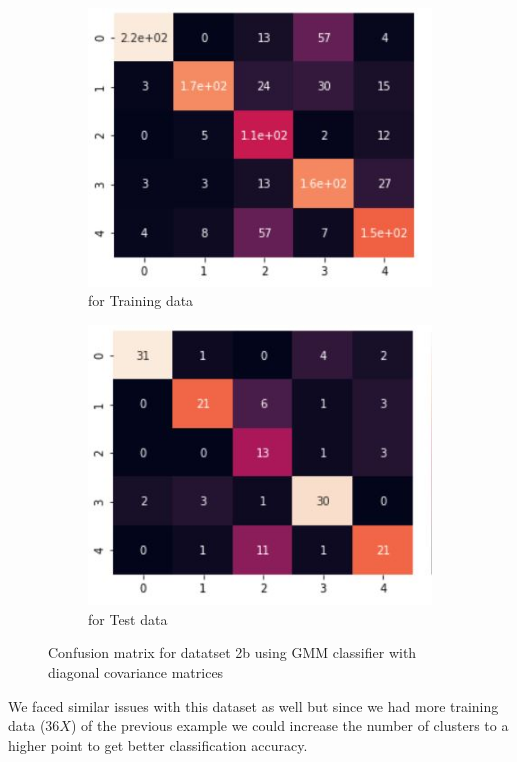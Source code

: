 \documentclass[11pt]{article}
\begin{document}
\begin{figure}[h]
\centering
	\begin{subfigure}[b]{0.45\textwidth}
	\centering
	\includegraphics[scale=0.6]{dataset2b_gmm_diagonal_hm_train.jpg}
	\caption{for Training data}
	\label{fig:fig2.2.3.1}
	\end{subfigure}
	\hfill
	\begin{subfigure}[b]{0.45\textwidth}
	\centering
	\includegraphics[scale=0.6]{dataset2b_gmm_diagonal_hm_test.jpg}
	\caption{for Test data}
	\label{fig:fig2.2.3.2}
	\end{subfigure}
\caption{Confusion matrix for datatset 2b using GMM classifier with diagonal covariance matrices}
\label{fig:fig1.2.1}
\end{figure}

We faced similar issues with this dataset as well but since we had more training data ($36X$) of the previous example we could increase the number of clusters to a higher point to get better classification accuracy.
\end{document}
